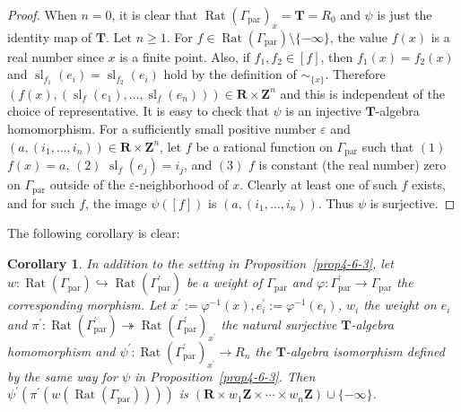 \documentclass[a4paper,12pt]{amsart}
\newtheorem{cor}[dfn]{Corollary}
\def\Gamma{\varGamma}
\begin{document}
\begin{proof}
When $n = 0$, it is clear that $\operatorname{Rat}(\Gamma_{\operatorname{par}})_x = \boldsymbol{T} = R_0$ and $\psi$ is just the identity map of $\boldsymbol{T}$.
Let $n \ge 1$.
For $f \in \operatorname{Rat}(\Gamma_{\operatorname{par}}) \setminus \{ -\infty \}$, the value $f(x)$ is a real number since $x$ is a finite point.
Also, if $f_1, f_2 \in [f]$, then $f_1(x) = f_2(x)$ and $\operatorname{sl}_{f_1}(e_i) = \operatorname{sl}_{f_2}(e_i)$ hold by the definition of $\sim_{\{x \}}$.
Therefore $(f(x), (\operatorname{sl}_f(e_1), \ldots, \operatorname{sl}_f(e_n))) \in \boldsymbol{R} \times \boldsymbol{Z}^n$ and this is independent of the choice of representative.
It is easy to check that $\psi$ is an injective $\boldsymbol{T}$-algebra homomorphism.
For a sufficiently small positive number $\varepsilon$ and $(a, (i_1, \ldots, i_n)) \in \boldsymbol{R} \times \boldsymbol{Z}^n$, let $f$ be a rational function on $\Gamma_{\operatorname{par}}$ such that $(1)$ $f(x) = a$, $(2)$ $\operatorname{sl}_f(e_j) = i_j$, and $(3)$ $f$ is constant (the real number) zero on $\Gamma_{\operatorname{par}}$ outside of the $\varepsilon$-neighborhood of $x$.
Clearly at least one of such $f$ exists, and for such $f$, the image $\psi([f])$ is $(a, (i_1, \ldots, i_n))$.
Thus $\psi$ is surjective.
\end{proof}

The following corollary is clear:

\begin{cor}
    \label{cor4-6-1}
In addition to the setting in Proposition~\ref{prop4-6-3}, let $w : \operatorname{Rat}(\Gamma_{\operatorname{par}}) \hookrightarrow \operatorname{Rat}(\Gamma^{\prime}_{\operatorname{par}})$ be a weight of $\Gamma_{\operatorname{par}}$ and $\varphi : \Gamma^{\prime}_{\operatorname{par}} \to \Gamma_{\operatorname{par}}$ the corresponding morphism.
Let $x^{\prime} := \varphi^{-1}(x), e^{\prime}_i := \varphi^{-1}(e_i)$, $w_i$ the weight on $e_i$ and $\pi^{\prime} : \operatorname{Rat}(\Gamma^{\prime}_{\operatorname{par}}) \twoheadrightarrow \operatorname{Rat}(\Gamma^{\prime}_{\operatorname{par}})_{x^{\prime}}$ the natural surjective $\boldsymbol{T}$-algebra homomorphism and $\psi^{\prime} : \operatorname{Rat}(\Gamma^{\prime}_{\operatorname{par}})_{x^{\prime}} \to R_n$ the $\boldsymbol{T}$-algebra isomorphism defined by the same way for $\psi$ in Proposition~\ref{prop4-6-3}.
Then $\psi^{\prime}(\pi^{\prime}(w(\operatorname{Rat}(\Gamma_{\operatorname{par}}))))$ is $(\boldsymbol{R} \times w_1\boldsymbol{Z} \times \cdots \times w_n\boldsymbol{Z}) \cup \{ -\infty \}$.
\end{cor}
\end{document}
